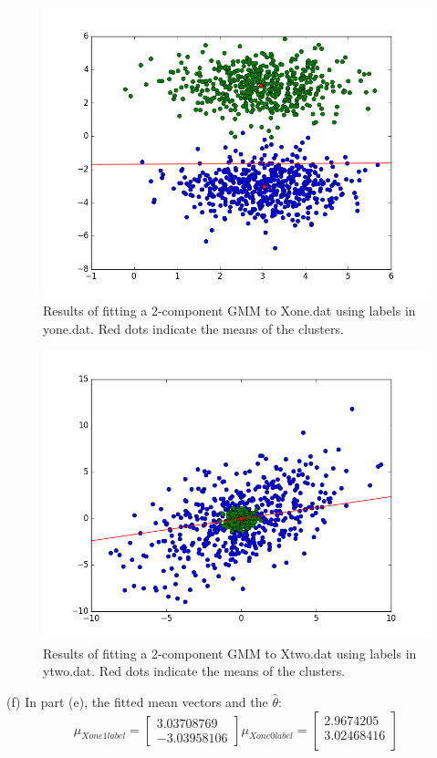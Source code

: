 \documentclass[11pt]{article}
\newenvironment{problem}[2][Problem]{\begin{trivlist}
\item[\hskip \labelsep {\bfseries #1}\hskip \labelsep {\bfseries #2.}]}{\end{trivlist}}
\begin{document}
\begin{problem}{2.4}
\begin{figure}[h!]
  \centering
  \includegraphics[scale=0.35]{figs/4f_1.png}
  \caption{Results of fitting a 2-component GMM to Xone.dat using labels in yone.dat. Red dots indicate the means of the clusters.}
  \label{fig:4e_1}
\end{figure}
\begin{figure}[h!]
  \centering
  \includegraphics[scale=0.35]{figs/4f_2.png}
  \caption{Results of fitting a 2-component GMM to Xtwo.dat using labels in ytwo.dat. Red dots indicate the means of the clusters.}
  \label{fig:4e_2}
\end{figure}


(f) In part (e), the fitted mean vectors and the $\hat{\theta}$:
\[\mu_{Xone1label}=
	\begin{bmatrix}
		3.03708769\\
		-3.03958106 
	 \end{bmatrix}
   \mu_{Xone0label}=
	\begin{bmatrix}
		2.9674205\\
		3.02468416\\
	 \end{bmatrix}
\]


\end{problem}
\end{document}
